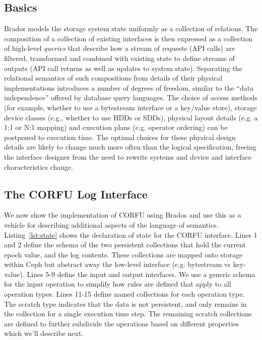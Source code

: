 \documentclass[10pt,twocolumn]{article}
\begin{document}
\subsection{Basics}

Brados models the storage system state uniformly as a collection of
relations. The composition of a collection of existing
interfaces is then expressed as a collection of high-level \emph{queries} that
describe how a stream of requests (API calls) are filtered, transformed and
combined with existing state to define streams of outputs (API call returns as
well as updates to system state).  Separating the relational semantics of such
compositions from details of their physical implementations introduces a
number of degrees of freedom, similar to the ``data independence'' offered by
database query languages.  The choice of access methods (for example, whether
to use a bytestream interface or a key/value store), storage device classes
(e.g., whether to use HDDs or SDDs), physical layout details (e.g. a 1:1 or
N:1 mapping) and execution plans (e.g. operator ordering) can be postponed to
execution time.  The optimal choices for these physical design details are
likely to change much more often than the logical specification, freeing the
interface designer from the need to rewrite systems and device and interface
characteristics change.

\subsection{The CORFU Log Interface}

We now show the implementation of CORFU using Brados and use this as a vehicle
for describing additional aspects of the language of semantics.
Listing~\ref{lst:state} shows the declaration of state for the CORFU
interface. Lines 1 and 2 define the schema of the two persistent collections
that hold the current epoch value, and the log contents. These collections are
mapped onto storage within Ceph but abstract away the low-level interface
(e.g. bytestream vs key-value). Lines 5-9 define the input and output
interfaces. We use a generic schema for the input operation to simplify
how rules are defined that apply to all operation types. Lines 11-15 define
named collections for each operation type. The scratch type indicates that the
data is not persistent, and only remains in the collection for a single 
execution time step. The remaining scratch collections are defined to further
subdivide the operations based on different properties which we'll describe next.
\end{document}
